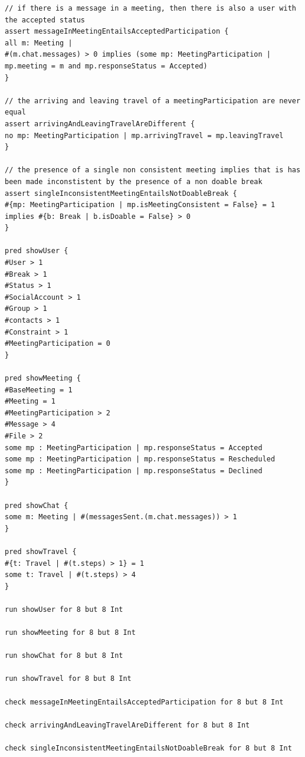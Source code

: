 \begin{lstlisting}[style=alloy]
// if there is a message in a meeting, then there is also a user with the accepted status
assert messageInMeetingEntailsAcceptedParticipation {
all m: Meeting | 
#(m.chat.messages) > 0 implies (some mp: MeetingParticipation | mp.meeting = m and mp.responseStatus = Accepted)
}

// the arriving and leaving travel of a meetingParticipation are never equal
assert arrivingAndLeavingTravelAreDifferent {
no mp: MeetingParticipation | mp.arrivingTravel = mp.leavingTravel
}

// the presence of a single non consistent meeting implies that is has been made inconstistent by the presence of a non doable break
assert singleInconsistentMeetingEntailsNotDoableBreak {
#{mp: MeetingParticipation | mp.isMeetingConsistent = False} = 1 implies #{b: Break | b.isDoable = False} > 0
}

pred showUser {
#User > 1
#Break > 1
#Status > 1
#SocialAccount > 1
#Group > 1
#contacts > 1
#Constraint > 1
#MeetingParticipation = 0
}

pred showMeeting {
#BaseMeeting = 1
#Meeting = 1
#MeetingParticipation > 2
#Message > 4
#File > 2
some mp : MeetingParticipation | mp.responseStatus = Accepted
some mp : MeetingParticipation | mp.responseStatus = Rescheduled
some mp : MeetingParticipation | mp.responseStatus = Declined
}

pred showChat {
some m: Meeting | #(messagesSent.(m.chat.messages)) > 1
}

pred showTravel {
#{t: Travel | #(t.steps) > 1} = 1
some t: Travel | #(t.steps) > 4
}

run showUser for 8 but 8 Int

run showMeeting for 8 but 8 Int

run showChat for 8 but 8 Int

run showTravel for 8 but 8 Int

check messageInMeetingEntailsAcceptedParticipation for 8 but 8 Int

check arrivingAndLeavingTravelAreDifferent for 8 but 8 Int

check singleInconsistentMeetingEntailsNotDoableBreak for 8 but 8 Int
\end{lstlisting}

